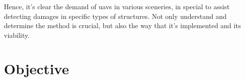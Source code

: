 Hence, it's clear the demand of \glspl*{uav} in various sceneries, in special to assist detecting damages in specific types of structures. Not only understand and determine the method is crucial, but also the way that it's implemented and its viability.

\section{Objective}\label{sec:objective}






